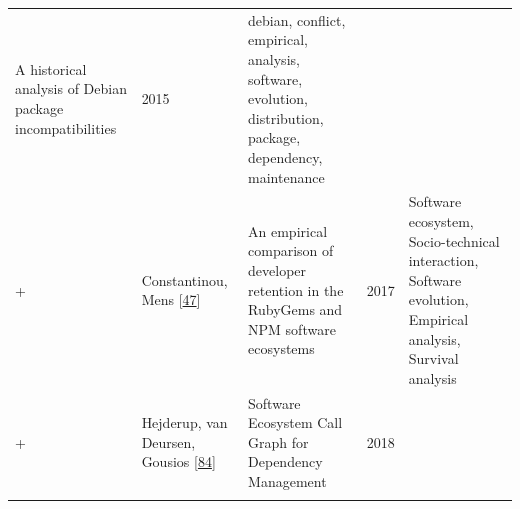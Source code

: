 \documentclass[]{book}
\begin{document}
\begin{longtable}[]{@{}lllll@{}}
\begin{minipage}[t]{0.34\columnwidth}
A historical analysis of Debian package incompatibilities\strut
\end{minipage} & \begin{minipage}[t]{0.02\columnwidth}\raggedright\strut
2015\strut
\end{minipage} & \begin{minipage}[t]{0.39\columnwidth}\raggedright\strut
debian, conflict, empirical, analysis, software, evolution,
distribution, package, dependency, maintenance\strut
\end{minipage}\tabularnewline
\begin{minipage}[t]{0.01\columnwidth}\raggedright\strut
+\strut
\end{minipage} & \begin{minipage}[t]{0.09\columnwidth}\raggedright\strut
Constantinou, Mens
{[}\protect\hyperlink{ref-Constantinou2017}{47}{]}\strut
\end{minipage} & \begin{minipage}[t]{0.34\columnwidth}\raggedright\strut
An empirical comparison of developer retention in the RubyGems and NPM
software ecosystems\strut
\end{minipage} & \begin{minipage}[t]{0.02\columnwidth}\raggedright\strut
2017\strut
\end{minipage} & \begin{minipage}[t]{0.39\columnwidth}\raggedright\strut
Software ecosystem, Socio-technical interaction, Software evolution,
Empirical analysis, Survival analysis\strut
\end{minipage}\tabularnewline
\begin{minipage}[t]{0.01\columnwidth}\raggedright\strut
+\strut
\end{minipage} & \begin{minipage}[t]{0.09\columnwidth}\raggedright\strut
Hejderup, van Deursen, Gousios
{[}\protect\hyperlink{ref-Hejderup2018}{84}{]}\strut
\end{minipage} & \begin{minipage}[t]{0.34\columnwidth}\raggedright\strut
Software Ecosystem Call Graph for Dependency Management\strut
\end{minipage} & \begin{minipage}[t]{0.02\columnwidth}\raggedright\strut
2018\strut
\end{minipage} & \begin{minipage}[t]{0.39\columnwidth}\raggedright\strut
\strut
\end{minipage}\tabularnewline
\begin{minipage}[t]{0.01\columnwidth}\raggedright\strut

\end{minipage}
\end{longtable}
\end{document}
